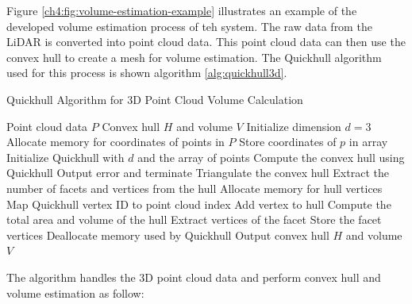 Figure \ref{ch4:fig:volume-estimation-example} illustrates an example of the developed volume estimation process of teh system. The raw data from the LiDAR is converted into point cloud data. This point cloud data can then use the convex hull to create a mesh for volume estimation. The Quickhull algorithm used for this process is shown algorithm \ref{alg:quickhull3d}.

\begin{algorithm}[H]
	\caption{Quickhull Algorithm for 3D Point Cloud Volume Calculation}
	\label{alg:quickhull3d}
	\begin{algorithmic}[1]
		\REQUIRE Point cloud data $P$
		\ENSURE Convex hull $H$ and volume $V$
		\STATE Initialize dimension $d = 3$
		\STATE Allocate memory for coordinates of points in $P$
		\STATE Store coordinates of $p$ in array
		\ENDFOR
		\STATE Initialize Quickhull with $d$ and the array of points
		\STATE Compute the convex hull using Quickhull
		\STATE Output error and terminate
		\ENDIF
		\STATE Triangulate the convex hull
		\STATE Extract the number of facets and vertices from the hull
		\STATE Allocate memory for hull vertices
		\STATE Map Quickhull vertex ID to point cloud index
		\STATE Add vertex to hull
		\ENDFOR
		\STATE Compute the total area and volume of the hull
		\ENDIF
		\STATE Extract vertices of the facet
		\STATE Store the facet vertices
		\ENDFOR
		\ENDIF
		\STATE Deallocate memory used by Quickhull
		\STATE Output convex hull $H$ and volume $V$
	\end{algorithmic}
\end{algorithm}

The algorithm handles the 3D point cloud data and perform convex hull and volume estimation as follow:

